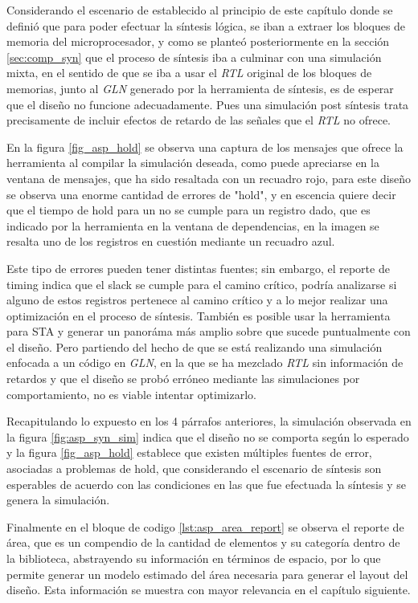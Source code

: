 Considerando el escenario de establecido al principio de este capítulo donde se definió que para poder efectuar la síntesis lógica, se iban a extraer los bloques de memoria del microprocesador, y como se planteó posteriormente en la sección \ref{sec:comp_syn} que el proceso de síntesis iba a culminar con una simulación mixta, en el sentido de que se iba a usar el \textit{RTL} original de los bloques de memorias, junto al \textit{GLN} generado por la herramienta de síntesis, es de esperar que el diseño no funcione adecuadamente. Pues una simulación post síntesis trata precisamente de incluir efectos de retardo de las señales que el \textit{RTL} no ofrece.

En la figura \ref{fig_asp_hold} se observa una captura de los mensajes que ofrece la herramienta al compilar la simulación deseada, como puede apreciarse en la ventana de mensajes, que ha sido resaltada con un recuadro rojo, para este diseño se observa una enorme cantidad de errores de "hold", y  en escencia quiere decir que el tiempo de hold para un no se cumple para un registro dado, que es indicado por la herramienta en la ventana de dependencias, en la imagen se resalta uno de los registros en cuestión mediante un recuadro azul.

Este tipo de errores pueden tener distintas fuentes; sin embargo, el reporte de timing indica que el slack se cumple para el camino crítico, podría analizarse si alguno de estos registros pertenece al camino crítico y a lo mejor realizar una optimización en el proceso de síntesis. También es posible usar la herramienta para STA y generar un panoráma más amplio sobre que sucede puntualmente con el diseño. Pero partiendo del hecho de que se está realizando una simulación enfocada a un código en \textit{GLN}, en la que se ha mezclado \textit{RTL} sin información de retardos y que el diseño se probó erróneo mediante las simulaciones por comportamiento, no es viable intentar optimizarlo.

Recapitulando lo expuesto en los 4 párrafos anteriores, la simulación observada en la figura \ref{fig:asp_syn_sim} indica que el diseño no se comporta según lo esperado y la figura \ref{fig_asp_hold} establece que existen múltiples fuentes de error, asociadas a problemas de hold, que considerando el escenario de síntesis son esperables de acuerdo con las condiciones en las que fue efectuada la síntesis y se genera la simulación.

Finalmente en el bloque de codigo \ref{lst:asp_area_report} se observa el reporte de área, que es un compendio de la cantidad de elementos y su categoría dentro de la biblioteca, abstrayendo su información en términos de espacio, por lo que permite generar un modelo estimado del área necesaria para generar el layout del diseño. Esta información se muestra con mayor relevancia en el capítulo siguiente.


